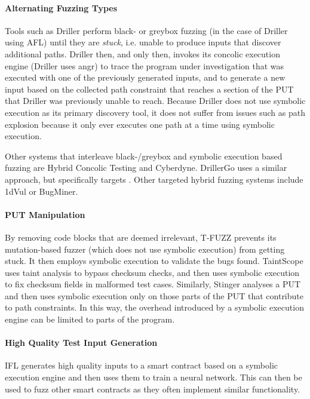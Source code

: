 \documentclass{article}
\begin{document}
\begin{multicols}{2}
    \paragraph{Alternating Fuzzing Types} Tools such as Driller\cite{Driller} perform black- or greybox fuzzing (in the case of Driller using AFL\cite{AFLPlusPlus}) until they are \textit{stuck}, i.e. unable to produce inputs that discover additional paths. Driller then, and only then, invokes its concolic execution engine (Driller uses angr\cite{angr}) to trace the program under investigation that was executed with one of the previously generated inputs, and to generate a new input based on the collected path constraint that reaches a section of the PUT that Driller was previously unable to reach. Because Driller does not use symbolic execution as its primary discovery tool, it does not suffer from issues such as path explosion because it only ever executes one path at a time using symbolic execution.

    Other systems that interleave black-/greybox and symbolic execution based fuzzing are Hybrid Concolic Testing\cite{HCT} and Cyberdyne\cite{Cyberdyne}. DrillerGo\cite{DrillerGo} uses a similar approach, but specifically targets \cite{DrillerGo}. Other targeted hybrid fuzzing systems include 1dVul\cite{1dVul} or BugMiner\cite{BugMiner}.

    \paragraph{PUT Manipulation} By removing code blocks that are deemed irrelevant, T-FUZZ\cite{TFuzz} prevents its mutation-based fuzzer (which does not use symbolic execution) from getting stuck. It then employs symbolic execution to validate the bugs found. TaintScope\cite{TaintScope} uses taint analysis to bypass checksum checks, and then uses symbolic execution to fix checksum fields in malformed test cases. Similarly, Stinger\cite{Stinger} analyses a PUT and then uses symbolic execution only on those parts of the PUT that contribute to path constraints. In this way, the overhead introduced by a symbolic execution engine can be limited to parts of the program.

    \paragraph{High Quality Test Input Generation} IFL\cite{IFL} generates high quality inputs to a smart contract based on a symbolic execution engine and then uses them to train a neural network. This can then be used to fuzz other smart contracts as they often implement similar functionality.


\end{multicols}
\end{document}
